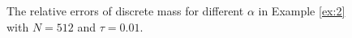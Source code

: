 \documentclass[preprint,compress,3p,10pt,fleqn]{elsarticle}
\numberwithin{equation}{section}
\begin{document}
\begin{figure}[H]
\begin{center}
 \caption{The relative errors of discrete mass for different $\alpha$ in Example \ref{ex:2} with $N = 512$ and $\tau=0.01$.} \label{fig:5}
\end{center}
\end{figure}
\end{document}
